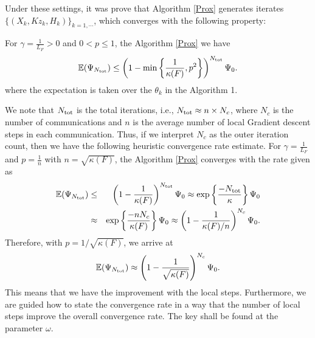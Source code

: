 Under these settings, it was prove that Algorithm \ref{Prox} generates iterates 
$\{(X_k, Kz_k, H_k)\}_{k = 1,\cdots}$, which converges with the following property: 
\begin{theorem} 
For $\gamma = \frac{1}{L_F} > 0$ and $0 < p \leq 1$, the Algorithm \ref{Prox} we have 
\begin{equation} 
\mathbb{E}(\Psi_{N_{\rm tot}}) \leq \left (1 - \min \left \{ \frac{1}{\kappa(F)}, p^2 \right \} \right )^{N_{\rm tot}} \Psi_0. 
\end{equation} 
where the expectation is taken over the $\theta_k$ in the Algorithm 1. 
\end{theorem} 
We note that $N_{\rm tot}$ is the total iterations, i.e., $N_{\rm tot} \approx n \times N_c$, where $N_c$ is the number of communications and $n$ is the average number of local Gradient descent steps in each communication. Thus, if we interpret $N_c$ as the outer iteration count, then we have the following heuristic convergence rate estimate. For $\gamma = \frac{1}{L_F}$ and $p = \frac{1}{n}$ with $n = \sqrt{\kappa(F)}$, the Algorithm \ref{Prox} converges with the rate given as \begin{eqnarray*} 
\mathbb{E}(\Psi_{N_{\rm tot}}) &\leq& \left (1 - \frac{1}{\kappa(F)} \right )^{N_{\rm tot}} \Psi_0 \approx \exp \left \{ \frac{-N_{\rm tot}}{\kappa} \right \} \Psi_0 \\
&\approx& \exp \left \{ \frac{-n N_c}{\kappa(F)} \right \} \Psi_0 \approx \left ( 1 - \frac{1}{\kappa(F)/n} \right )^{N_c} \Psi_0. 
\end{eqnarray*} 
Therefore, with $p = 1/\sqrt{\kappa(F)}$, we arrive at 
\begin{equation}
\mathbb{E}(\Psi_{N_{\rm tot}}) \approx \left ( 1 - \frac{1}{\sqrt{\kappa(F)}} \right )^{N_c} \Psi_0. 
\end{equation}
This means that we have the improvement with the local steps. Furthermore, we are guided how to state the convergence rate in a way that the number of local steps improve the overall convergence rate. The key shall be found at the parameter $\omega$. 
